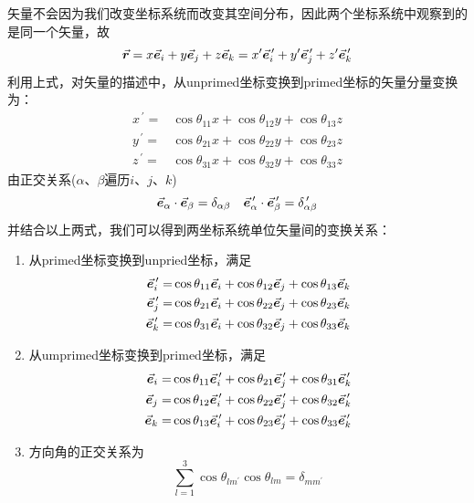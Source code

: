 矢量不会因为我们改变坐标系统而改变其空间分布，因此两个坐标系统中观察到的是同一个矢量，故
\begin{equation}
	\vec{\bm{r}} = x \vec{\bm{e}}_{i} + y \vec{\bm{e}}_{j} + z \vec{\bm{e}}_{k}
	     = x^{\prime} \vec{\bm{e}}_{i}^{\,\prime} + y^{\prime} \vec{\bm{e}}_{j}^{\,\prime} + z^{\prime} \vec{\bm{e}}_{k}^{\,\prime}
\end{equation}
利用上式，对矢量的描述中，从unprimed坐标变换到primed坐标的矢量分量变换为：
\begin{equation}
	\begin{aligned}
		x^{\,\prime} =& \cos{\theta_{11}} x + \cos{\theta_{12}} y + \cos{\theta_{13}} z \\
		y^{\,\prime} =& \cos{\theta_{21}} x + \cos{\theta_{22}} y + \cos{\theta_{23}} z \\
		z^{\,\prime} =& \cos{\theta_{31}} x + \cos{\theta_{32}} y + \cos{\theta_{33}} z
	\end{aligned}
\end{equation}
由正交关系($\alpha$、$\beta$遍历$i$、$j$、$k$)
\begin{equation}
	\vec{\bm{e}}_{\alpha} \cdot \vec{\bm{e}}_{\beta} = \delta_{\alpha\beta}
	\quad
	\vec{\bm{e}}_{\alpha}^{\,\prime} \cdot \vec{\bm{e}}_{\beta}^{\,\prime} = \delta_{\alpha\beta}^{\,\prime}
\end{equation}
并结合以上两式，我们可以得到两坐标系统单位矢量间的变换关系：
\begin{enumerate}
	\item 从primed坐标变换到unpried坐标，满足
		\begin{equation}
			\begin{aligned}
				\vec{\bm{e}}_{i}^{\,\prime} =& \cos{\theta_{11}} \vec{\bm{e}}_{i} + \cos{\theta_{12}} \vec{\bm{e}}_{j} + \cos{\theta_{13}} \vec{\bm{e}}_{k} \\
				\vec{\bm{e}}_{j}^{\,\prime} =& \cos{\theta_{21}} \vec{\bm{e}}_{i} + \cos{\theta_{22}} \vec{\bm{e}}_{j} + \cos{\theta_{23}} \vec{\bm{e}}_{k} \\
				\vec{\bm{e}}_{k}^{\,\prime} =& \cos{\theta_{31}} \vec{\bm{e}}_{i} + \cos{\theta_{32}} \vec{\bm{e}}_{j} + \cos{\theta_{33}} \vec{\bm{e}}_{k}
			\end{aligned}
		\end{equation}
	\item 从umprimed坐标变换到primed坐标，满足
	\begin{equation}
		\begin{aligned}
			\vec{\bm{e}}_{i} =& \cos{\theta_{11}} \vec{\bm{e}}_{i}^{\,\prime} + \cos{\theta_{21}} \vec{\bm{e}}_{j}^{\,\prime} + \cos{\theta_{31}} \vec{\bm{e}}_{k}^{\,\prime} \\
			\vec{\bm{e}}_{j} =& \cos{\theta_{12}} \vec{\bm{e}}_{i}^{\,\prime} + \cos{\theta_{22}} \vec{\bm{e}}_{j}^{\,\prime} + \cos{\theta_{32}} \vec{\bm{e}}_{k}^{\,\prime} \\
			\vec{\bm{e}}_{k} =& \cos{\theta_{13}} \vec{\bm{e}}_{i}^{\,\prime} + \cos{\theta_{23}} \vec{\bm{e}}_{j}^{\,\prime} + \cos{\theta_{33}} \vec{\bm{e}}_{k}^{\,\prime}
		\end{aligned}
	\end{equation}
	\item 方向角的正交关系为
		\begin{equation}
			\sum_{l = 1}^{3} \cos{\theta}_{lm^{\prime}} \cos{\theta}_{lm} = \delta_{mm^{\prime}}
		\end{equation}
\end{enumerate}


